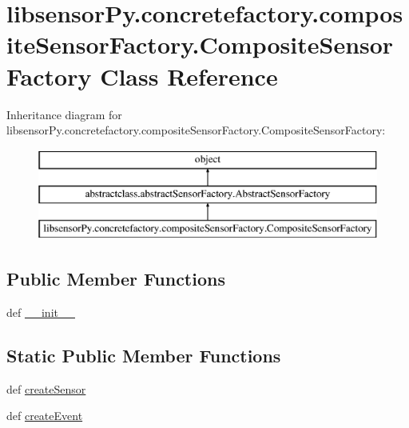 \hypertarget{classlibsensorPy_1_1concretefactory_1_1compositeSensorFactory_1_1CompositeSensorFactory}{}\section{libsensor\+Py.\+concretefactory.\+composite\+Sensor\+Factory.\+Composite\+Sensor\+Factory Class Reference}
\label{classlibsensorPy_1_1concretefactory_1_1compositeSensorFactory_1_1CompositeSensorFactory}
Inheritance diagram for libsensor\+Py.\+concretefactory.\+composite\+Sensor\+Factory.\+Composite\+Sensor\+Factory\+:\begin{figure}[H]
\begin{center}
\leavevmode
\includegraphics[height=3.000000cm]{classlibsensorPy_1_1concretefactory_1_1compositeSensorFactory_1_1CompositeSensorFactory}
\end{center}
\end{figure}
\subsection*{Public Member Functions}
\begin{DoxyCompactItemize}
\item 
def \hyperlink{classlibsensorPy_1_1concretefactory_1_1compositeSensorFactory_1_1CompositeSensorFactory_aacb9a9586c598928a91681329ea6ef76}{\+\_\+\+\_\+init\+\_\+\+\_\+}
\end{DoxyCompactItemize}
\subsection*{Static Public Member Functions}
\begin{DoxyCompactItemize}
\item 
def \hyperlink{classlibsensorPy_1_1concretefactory_1_1compositeSensorFactory_1_1CompositeSensorFactory_a9a3e97cc68b1c04ed889b4e7597b126f}{create\+Sensor}
\item 
def \hyperlink{classlibsensorPy_1_1concretefactory_1_1compositeSensorFactory_1_1CompositeSensorFactory_abb9e77f2cdf6519dae5dee57da096199}{create\+Event}
\end{DoxyCompactItemize}


